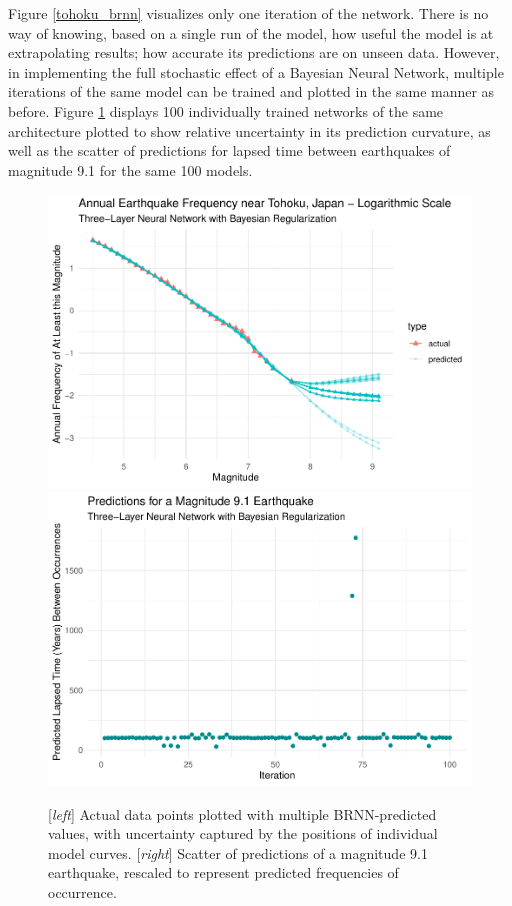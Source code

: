 Figure \ref{tohoku_brnn} visualizes only one iteration of the network.  There is no way of knowing, based on a single run of the model, how useful the model is at extrapolating results; how accurate its predictions are on unseen data.  However, in implementing the full stochastic effect of a Bayesian Neural Network, multiple iterations of the same model can be trained and plotted in the same manner as before.  Figure \ref{tohoku_brnn_uncert} displays 100 individually trained networks of the same architecture plotted to show relative uncertainty in its prediction curvature, as well as the scatter of predictions for lapsed time between earthquakes of magnitude 9.1 for the same 100 models.

\begin{figure}[H]
    \includegraphics[width=0.5\linewidth]{earthquakes_files/figure-latex/unnamed-chunk-12-1.pdf}
    \includegraphics[width=0.5\linewidth]{earthquakes_files/figure-latex/unnamed-chunk-12-2.pdf}
    \caption{\footnotesize{[\textit{left}] Actual data points plotted with multiple BRNN-predicted values, with uncertainty captured by the positions of individual model curves. [\textit{right}] Scatter of predictions of a magnitude 9.1 earthquake, rescaled to represent predicted frequencies of occurrence.}}
    \label{tohoku_brnn_uncert}
\end{figure}

